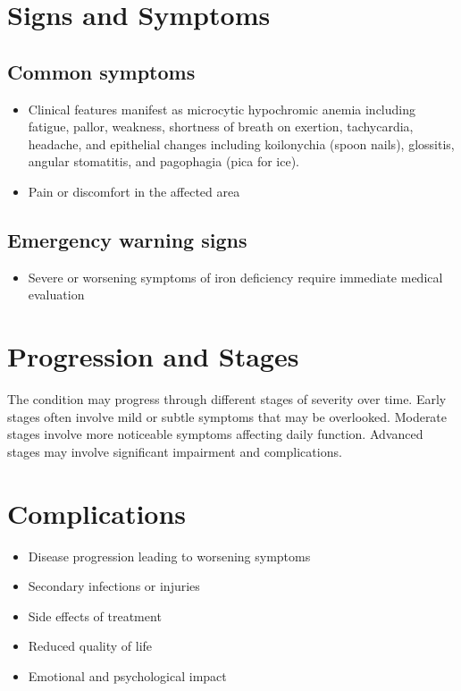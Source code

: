 \section{Signs and Symptoms}

\subsection{Common symptoms}
\begin{itemize}[noitemsep]
  \item Clinical features manifest as microcytic hypochromic anemia including fatigue, pallor, weakness, shortness of breath on exertion, tachycardia, headache, and epithelial changes including koilonychia (spoon nails), glossitis, angular stomatitis, and pagophagia (pica for ice).
  \item Pain or discomfort in the affected area
  \end{itemize}

\subsection{Emergency warning signs}
\begin{itemize}[noitemsep]
  \item Severe or worsening symptoms of iron deficiency require immediate medical evaluation
\end{itemize}
\section{Progression and Stages}
The condition may progress through different stages of severity over time. Early stages often involve mild or subtle symptoms that may be overlooked. Moderate stages involve more noticeable symptoms affecting daily function. Advanced stages may involve significant impairment and complications.
\section{Complications}
\begin{itemize}[noitemsep]
  \item Disease progression leading to worsening symptoms
  \item Secondary infections or injuries
  \item Side effects of treatment
  \item Reduced quality of life
  \item Emotional and psychological impact
\end{itemize}
